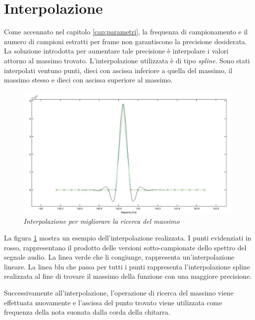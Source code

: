 \section{Interpolazione}\label{cap:interpolazione}

Come accennato nel capitolo \ref{cap:parametri}, la frequenza di campionamento e il numero di campioni estratti per frame non garantiscono la precisione desiderata.
La soluzione introdotta per aumentare tale precisione è interpolare i valori attorno al massimo trovato.
L'interpolazione utilizzata è di tipo \emph{spline}.
Sono stati interpolati ventuno punti, dieci con ascissa inferiore a quella del massimo, il massimo stesso e dieci con ascissa superiore al massimo.

	\begin{figure}[h]
	  \begin{center} 
	    \includegraphics[width=\textwidth*\real{0.9}]{images/ch_05/interpolazione.jpg}
	  \end{center} 
	  \caption{\textit{Interpolazione per migliorare la ricerca del massimo}}  
	  \label{fig:interpolazione}
	\end{figure}

La figura \ref{fig:interpolazione} mostra un esempio dell'interpolazione realizzata. 
I punti evidenziati in rosso, rappresentano il prodotto delle versioni sotto-campionate dello spettro del segnale audio.
La linea verde che li congiunge, rappresenta un'interpolazione lineare.
La linea blu che passa per tutti i punti rappresenta l'interpolazione spline realizzata al fine di trovare il massimo della funzione con una maggiore precisione.

Successivamente all'interpolazione, l'operazione di ricerca del massimo viene effettuata nuovamente e l'ascissa del punto trovato viene utilizzata come frequenza della nota suonata dalla corda della chitarra.

